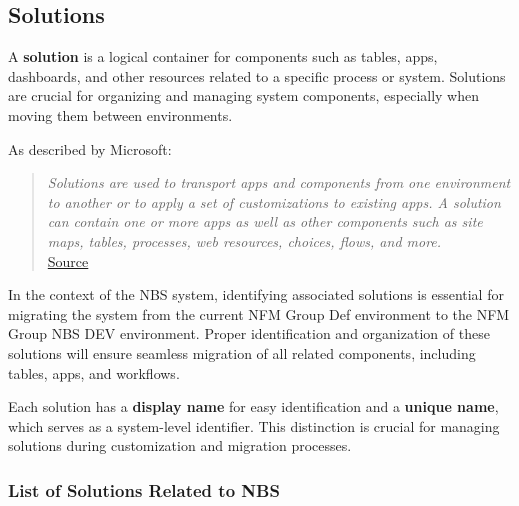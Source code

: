 

\subsection{Solutions}

A \textbf{solution} is a logical container for components such as tables, apps, dashboards, and other resources related to a specific process or system. Solutions are crucial for organizing and managing system components, especially when moving them between environments.

As described by Microsoft:

\begin{quote}
	\textit{Solutions are used to transport apps and components from one environment to another or to apply a set of customizations to existing apps. A solution can contain one or more apps as well as other components such as site maps, tables, processes, web resources, choices, flows, and more.} \\
	\href{https://learn.microsoft.com/en-us/power-apps/maker/data-platform/solutions-overview}{Source}
\end{quote}

In the context of the NBS system, identifying associated solutions is essential for migrating the system from the current NFM Group Def environment to the NFM Group NBS DEV environment. Proper identification and organization of these solutions will ensure seamless migration of all related components, including tables, apps, and workflows.

Each solution has a \textbf{display name} for easy identification and a \textbf{unique name}, which serves as a system-level identifier. This distinction is crucial for managing solutions during customization and migration processes.

\subsubsection{List of Solutions Related to NBS}


